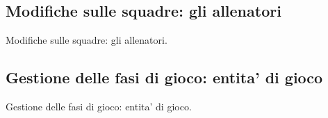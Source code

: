 \subsection*{Modifiche sulle squadre: gli allenatori}
%
\label{sec:modello_squadre_allenatori}

Modifiche sulle squadre: gli allenatori.

\subsection*{Gestione delle fasi di gioco: entita' di gioco}
%
\label{sec:modello_fasi_game_entity}

Gestione delle fasi di gioco: entita' di gioco.
